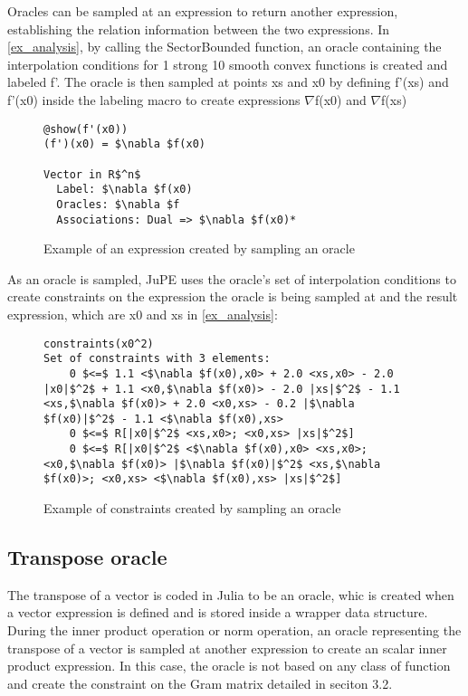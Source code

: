 Oracles can be sampled at an expression to return another expression, establishing the relation information between the two expressions.  In \ref{ex_analysis}, by calling the SectorBounded function, an oracle containing the interpolation conditions for 1 strong 10 smooth convex functions is created and labeled f'. The oracle is then sampled at points xs and x0 by defining f'(xs) and f'(x0) inside the labeling macro to create expressions $\nabla $f(x0) and $\nabla $f(xs)

\begin{figure}[!h]
	\begin{lstlisting}[mathescape]
@show(f'(x0))
(f')(x0) = $\nabla $f(x0)

Vector in R$^n$
  Label: $\nabla $f(x0)
  Oracles: $\nabla $f
  Associations: Dual => $\nabla $f(x0)*

\end{lstlisting}
\caption{Example of an expression created by sampling an oracle}
\label{ex_sampling}
\end{figure}

As an oracle is sampled, JuPE uses the oracle's set of interpolation conditions to create constraints on the expression the oracle is being sampled at and the result expression, which are x0 and xs in \ref{ex_analysis}:

\begin{figure}[!h]
	\begin{lstlisting}[mathescape]
constraints(x0^2)
Set of constraints with 3 elements:
	0 $<=$ 1.1 <$\nabla $f(x0),x0> + 2.0 <xs,x0> - 2.0 |x0|$^2$ + 1.1 <x0,$\nabla $f(x0)> - 2.0 |xs|$^2$ - 1.1 <xs,$\nabla $f(x0)> + 2.0 <x0,xs> - 0.2 |$\nabla $f(x0)|$^2$ - 1.1 <$\nabla $f(x0),xs>
	0 $<=$ R[|x0|$^2$ <xs,x0>; <x0,xs> |xs|$^2$]
	0 $<=$ R[|x0|$^2$ <$\nabla $f(x0),x0> <xs,x0>; <x0,$\nabla $f(x0)> |$\nabla $f(x0)|$^2$ <xs,$\nabla $f(x0)>; <x0,xs> <$\nabla $f(x0),xs> |xs|$^2$]
	\end{lstlisting}
	\caption{Example of constraints created by sampling an oracle}
	\label{ex_orc_constraints}
\end{figure}

\subsection*{Transpose oracle}

The transpose of a vector is coded in Julia to be an oracle, whic is created when a vector expression is defined and is stored inside a wrapper data structure. During the inner product operation or norm operation, an oracle representing the transpose of a vector is sampled at another expression to create an scalar inner product expression. In this case, the oracle is not based on any class of function and create the constraint on the Gram matrix detailed in seciton 3.2. 

